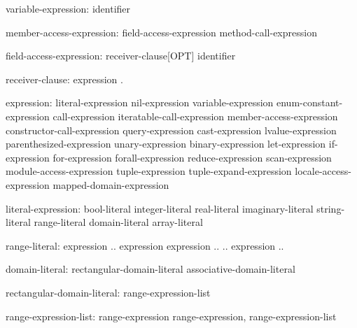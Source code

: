\begin{syntax}
variable-expression:
  identifier
\end{syntax}

\begin{syntax}
member-access-expression:
  field-access-expression
  method-call-expression
\end{syntax}

\begin{syntax}
field-access-expression:
  receiver-clause[OPT] identifier
\end{syntax}

\begin{syntax}
receiver-clause:
  expression .
\end{syntax}

\begin{syntax}
expression:
  literal-expression
  nil-expression
  variable-expression
  enum-constant-expression
  call-expression
  iteratable-call-expression
  member-access-expression
  constructor-call-expression
  query-expression
  cast-expression
  lvalue-expression
  parenthesized-expression
  unary-expression
  binary-expression
  let-expression
  if-expression
  for-expression
  forall-expression
  reduce-expression
  scan-expression
  module-access-expression
  tuple-expression
  tuple-expand-expression
  locale-access-expression
  mapped-domain-expression
\end{syntax}

\begin{syntax}
literal-expression:
  bool-literal
  integer-literal
  real-literal
  imaginary-literal
  string-literal
  range-literal
  domain-literal
  array-literal
\end{syntax}

\begin{syntax}
range-literal:
  expression .. expression
  expression ..
  .. expression
  ..
\end{syntax}

\begin{syntax}
domain-literal:
  rectangular-domain-literal
  associative-domain-literal
\end{syntax}

\begin{syntax}
rectangular-domain-literal:
  { range-expression-list }
\end{syntax}

\begin{syntax}
range-expression-list:
  range-expression
  range-expression, range-expression-list
\end{syntax}

